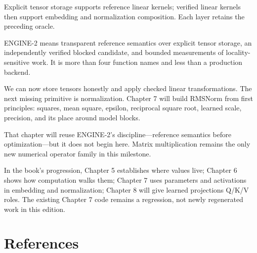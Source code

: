 Explicit tensor storage supports reference linear kernels; verified linear kernels then support embedding and normalization composition. Each layer retains the preceding oracle.

ENGINE-2 means transparent reference semantics over explicit tensor
storage, an independently verified blocked candidate, and bounded
measurements of locality-sensitive work. It is more than four function
names and less than a production backend.

We can now store tensors honestly and apply checked linear
transformations. The next missing primitive is normalization. Chapter 7
will build RMSNorm from first principles: squares, mean square, epsilon,
reciprocal square root, learned scale, precision, and its place around
model blocks.

That chapter will reuse ENGINE-2's discipline---reference semantics
before optimization---but it does not begin here. Matrix multiplication
remains the only new numerical operator family in this milestone.

In the book's progression, Chapter 5 establishes where values live;
Chapter 6 shows how computation walks them; Chapter 7 uses parameters
and activations in embedding and normalization; Chapter 8 will give
learned projections Q/K/V roles. The existing Chapter 7 code remains a
regression, not newly regenerated work in this edition.

\section{References}\label{references-3}

